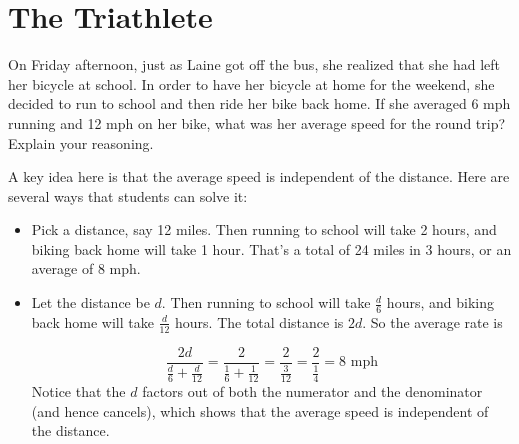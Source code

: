 \newpage
\section{The Triathlete}\label{A:Triathlete}

\begin{prob} 
On Friday afternoon, just as Laine got off the bus, she realized that she had left her bicycle at school.  In order to have her bicycle at home for the weekend, she decided to run to school and then ride her bike back home.  If she averaged 6 mph running and 12 mph on her bike, what was her average speed for the round trip?  Explain your reasoning. 
\end{prob}

\begin{teachingnote}
A key idea here is that the average speed is independent of the distance.  Here are several ways that students can solve it: 
\begin{itemize}
\item Pick a distance, say 12 miles.  Then running to school will take 2 hours, and biking back home will take 1 hour.  That's a total of 24 miles in 3 hours, or an average of 8 mph.  
\item Let the distance be $d$.  Then running to school will take $\frac{d}{6}$ hours, and biking back home will take $\frac{d}{12}$ hours.  The total distance is $2d$.  So the average rate is 

$$\frac{2d}{\frac{d}{6}+\frac{d}{12}}=\frac{2}{\frac{1}{6}+\frac{1}{12}}=\frac{2}{\frac{3}{12}}=\frac{2}{\frac{1}{4}}=8 \text{ mph}$$
Notice that the $d$ factors out of both the numerator and the denominator (and hence cancels), which shows that the average speed is independent of the distance.  


\end{itemize}
\end{teachingnote}
